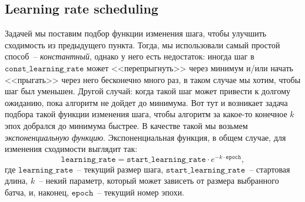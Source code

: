 \documentclass[12pt, a4paper, oneside, final]{article}
\begin{document}
	\subsection*{Learning rate scheduling}
	Задачей мы поставим подбор функции изменения шага, чтобы улучшить сходимость из предыдущего пункта.
	Тогда, мы использовали самый простой способ~-- \textit{константный}, однако у него есть недостаток: иногда шаг в $\mathtt{const\_learning\_rate}$ может <<перепрыгнуть>> через минимум и/или начать <<прыгать>> через него бесконечно много раз, в таком случае мы хотим, чтобы шаг был уменьшен.
	Другой случай: когда такой шаг может привести к долгому ожиданию, пока алгоритм не дойдет до минимума.
	Вот тут и возникает задача подбора такой функции изменения шага, чтобы алгоритм за какое-то конечное $k$ эпох добрался до минимума быстрее. 
	В качестве такой мы возьмем \textit{экспоненциальную функцию}.
	Экспоненциальная функция, в общем случае, для изменения сходимости выглядит так:
	\[
		\mathtt{learning\_rate} = \mathtt{start\_learning\_rate} \cdot e^{-k \cdot \mathtt{epoch}},
	\] где $\mathtt{learning\_rate}$~-- текущий размер шага, $\mathtt{start\_learning\_rate}$~-- стартовая длина, $k$~-- некий параметр, который может зависеть от размера выбранного батча, и, наконец, $\mathtt{epoch}$~-- текущий номер эпохи.
\end{document}
